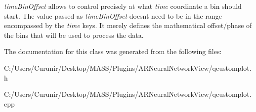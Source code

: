 {\itshape time\+Bin\+Offset} allows to control precisely at what {\itshape time} coordinate a bin should start. The value passed as {\itshape time\+Bin\+Offset} doesn\textquotesingle{}t need to be in the range encompassed by the {\itshape time} keys. It merely defines the mathematical offset/phase of the bins that will be used to process the data. 

The documentation for this class was generated from the following files\+:\begin{DoxyCompactItemize}
\item 
C\+:/\+Users/\+Curunir/\+Desktop/\+M\+A\+S\+S/\+Plugins/\+A\+R\+Neural\+Network\+View/qcustomplot.\+h\item 
C\+:/\+Users/\+Curunir/\+Desktop/\+M\+A\+S\+S/\+Plugins/\+A\+R\+Neural\+Network\+View/qcustomplot.\+cpp\end{DoxyCompactItemize}
